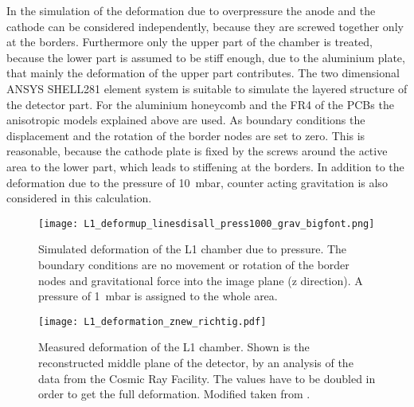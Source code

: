 \documentclass[
a4paper,                                %
twoside,                                %
BCOR1.4cm,                      %
10pt,                           %
headings=normal,                %
headsepline,                    %
clearplainpage, %
final,                                  %
div=14,
parskip=full,
openright,
bibliography=toc
]{scrreprt}
\begin{document}
In the simulation of the deformation due to overpressure the anode and the cathode can be considered independently, because they are screwed together only at the borders. Furthermore only the upper part of the chamber is treated, because the lower part is  assumed to be stiff enough, due to the aluminium plate, that mainly the deformation of the upper part contributes. The two dimensional ANSYS SHELL281 element system is suitable to simulate the layered structure of the detector part. For the aluminium honeycomb and the FR4 of the PCBs the anisotropic models explained above are used. As boundary conditions the displacement and the rotation of the border nodes are set to zero. This is reasonable, because the cathode plate is fixed by the screws around the active area to the lower part, which leads to stiffening at the borders. In addition to the deformation due to the pressure of \SI{10}{mbar}, counter acting gravitation is also considered in this calculation. %

\captionsetup[figure]{format=plain, labelsep=newline}
\begin{figure}[H]
	\begin{minipage}[b]{0.45\linewidth}
		\centering
		\texttt{[image: L1\_deformup\_linesdisall\_press1000\_grav\_bigfont.png]}
		\caption{Simulated deformation of the L1 chamber due to pressure. The boundary conditions are no movement or rotation of the border nodes and gravitational force into the image plane (z direction). A pressure of \SI{1}{mbar} is assigned to the whole area.}
		\label{L1DefSim}
	\end{minipage}
	\hspace{0.5cm}
	\begin{minipage}[b]{0.45\linewidth}
		\centering
		\texttt{[image: L1\_deformation\_znew\_richtig.pdf]}
		\caption{Measured deformation of the L1 chamber. Shown is the reconstructed middle plane of the detector, by an analysis of the data from the Cosmic Ray Facility. The values have to be doubled in order to get the full deformation. Modified taken from \cite{philippLthesis}.}
		\label{L1DefMeas}
	\end{minipage}
\end{figure}
\captionsetup[figure]{format=hang, labelsep=colon}
\end{document}
